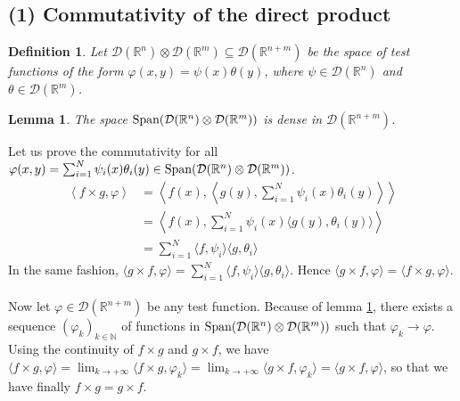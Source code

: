 \documentclass[11pt,a4paper]{article}
\newtheorem{defi}{Definition}
\newtheorem{lem}{Lemma}
\newcommand{\ph}{\varphi}
\newcommand{\N}{\mathbb{N}}
\newcommand{\R}{\mathbb{R}}
\newcommand{\1}{\mathbbm{1}}
\newcommand{\D}{\mathcal{D}}
\begin{document}
\subsection*{(1) Commutativity of the direct product}
\begin{defi}
Let $\D(\R^n) \otimes \D(\R^m) \subseteq \D(\R^{n+m})$ be the space of test functions of the form $\ph(x,y) = \psi(x)\theta(y)$, where $\psi \in \D(\R^n)$ and $\theta \in \D(\R^m)$.
\end{defi}
\begin{lem} \label{density}
The space $\textnormal{Span}(\D(\R^n) \otimes \D(\R^m))$ is dense in $\D(\R^{n+m})$.
\end{lem}
Let us prove the commutativity for all $\ph(x,y) = \sum_{i=1}^N \psi_i(x)\theta_i(y) \in \textnormal{Span}(\D(\R^n) \otimes \D(\R^m))$.
\begin{align*}
\left\langle f \times g  , \ph \right\rangle
& = \left\langle f(x) , \left\langle g(y) , \sum_{i=1}^N \psi_i(x)\theta_i(y) \right\rangle \right\rangle \\
& = \left\langle f(x) , \sum_{i=1}^N \psi_i(x) \langle g(y) , \theta_i(y) \rangle \right\rangle \\
& = \sum_{i=1}^N \langle f , \psi_i \rangle \langle g , \theta_i \rangle
\end{align*}
In the same fashion, $\langle g \times f , \ph \rangle = \sum_{i=1}^N \langle f,\psi_i \rangle \langle g , \theta_i \rangle$. Hence $\langle g \times f , \ph \rangle = \langle f \times g , \ph \rangle$.\\\\
Now let $\ph \in \D(\R^{n+m})$ be any test function. Because of lemma \ref{density}, there exists a sequence $(\ph_k)_{k\in\N}$ of functions in $\textnormal{Span}(\D(\R^n) \otimes \D(\R^m))$ such that $\ph_k \to \ph$. Using the continuity of $f \times g$ and $g \times f$, we have $\langle f \times g , \ph \rangle = \lim_{k\to +\infty} \langle f \times g , \ph_k \rangle = \lim_{k\to +\infty} \langle g \times f , \ph_k \rangle = \langle g \times f , \ph \rangle$, so that we have finally $f \times g = g \times f$.
\end{document}

